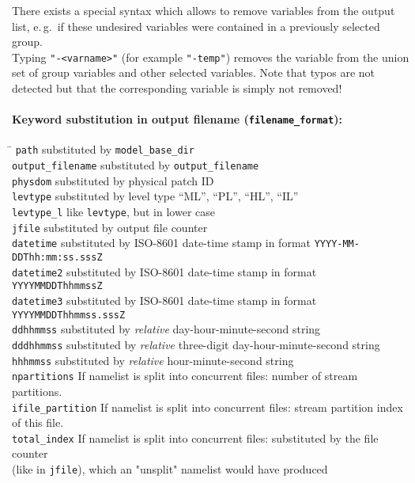 \begin{note}
      There exists a special syntax which allows to remove variables from the output list, e.\,g.\ if
      these undesired variables were contained in a previously selected group.\\
      Typing \texttt{"-\textnormal{<varname>}"} (for example \texttt{"-temp"}) removes the
      variable from the union set of group variables and other selected variables.
      Note that typos are not detected but that the corresponding variable is
      simply not removed!
\end{note}

\paragraph{Keyword substitution in output filename (\texttt{filename\_format}):}
\begin{tabbing}
\hspace*{0.4\textwidth} \= \kill
\texttt{path}              \>  substituted by \texttt{model\_base\_dir}                 \\
\texttt{output\_filename}  \>  substituted by \texttt{output\_filename}                 \\
\texttt{physdom}           \>  substituted by physical patch ID                         \\
\texttt{levtype}           \>  substituted by level type ``ML'', ``PL'', ``HL'', ``IL'' \\
\texttt{levtype\_l}        \>  like \texttt{levtype}, but in lower case                 \\
\texttt{jfile}             \>  substituted by output file counter                       \\
\texttt{datetime}          \>  substituted by ISO-8601 date-time stamp in format \texttt{YYYY-MM-DDThh:mm:ss.sssZ} \\
\texttt{datetime2}         \>  substituted by ISO-8601 date-time stamp in format \texttt{YYYYMMDDThhmmssZ}         \\
\texttt{datetime3}         \>  substituted by ISO-8601 date-time stamp in format \texttt{YYYYMMDDThhmmss.sssZ}     \\
\texttt{ddhhmmss}          \>  substituted by \emph{relative} day-hour-minute-second string \\
\texttt{dddhhmmss}         \>  substituted by \emph{relative} three-digit day-hour-minute-second string \\
\texttt{hhhmmss}           \>  substituted by \emph{relative} hour-minute-second string     \\
\texttt{npartitions}       \>  If namelist is split into concurrent files: number of stream partitions.           \\
\texttt{ifile\_partition}  \>  If namelist is split into concurrent files: stream partition index of this file.   \\
\texttt{total\_index}      \>  If namelist is split into concurrent files: substituted by the file counter \\ 
                           \>  (like in \texttt{jfile}), which an "unsplit" namelist would have produced
\end{tabbing}

